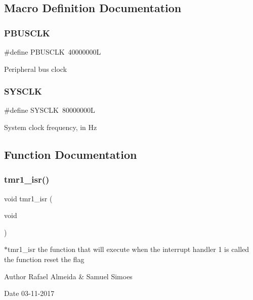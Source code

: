 \subsection{Macro Definition Documentation}
\mbox{\label{timer__libs_8c_afea81b612c0d335d1bd49be68c1a89d3}} 
\subsubsection{P\+B\+U\+S\+C\+LK}
{\footnotesize\ttfamily \#define P\+B\+U\+S\+C\+LK~40000000L}

Peripheral bus clock \mbox{\label{timer__libs_8c_a97ee8be60ff9ae1cfface03bc50f1d94}} 
\subsubsection{S\+Y\+S\+C\+LK}
{\footnotesize\ttfamily \#define S\+Y\+S\+C\+LK~80000000L}

System clock frequency, in Hz 

\subsection{Function Documentation}
\mbox{\label{timer__libs_8c_af03ffc6eb9d4dfc742513301eb656ba5}} 
\subsubsection{tmr1\+\_\+isr()}
{\footnotesize\ttfamily void tmr1\+\_\+isr (\begin{DoxyParamCaption}\item[{void}]{ }\end{DoxyParamCaption})}



$\ast$tmr1\+\_\+isr the function that will execute when the interrupt handler 1 is called the function reset the flag 

\begin{DoxyAuthor}{Author}
Rafael Almeida \& Samuel Simoes 
\end{DoxyAuthor}
\begin{DoxyDate}{Date}
03-\/11-\/2017 
\end{DoxyDate}
\mbox{\label{timer__libs_8c_a8de6a5e8a74fe35d5e749ef46af8e7ea}} 
